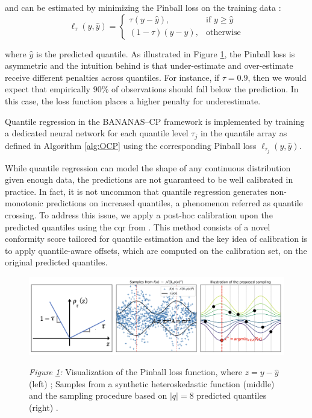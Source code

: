 {\begin{description}[leftmargin=0cm, listparindent=\parindent]
	\noindent and can be estimated by minimizing the Pinball loss on the training data \cite{koenker1978regression}:
		\begin{equation}
			\ell_\tau(y, \hat{y}) = 
			\begin{cases}
			\tau (y - \hat{y}), & \text{if } y \geq \hat{y} \\
			(1 - \tau)(\hat{y} - y), & \text{otherwise}
			\end{cases}
		\label{pinballloss}
		\end{equation}
		
	\noindent where $\hat{y}$ is the predicted quantile.	 As illustrated in Figure \ref{fig:CQR}, the Pinball loss is asymmetric and the intuition behind is that under-estimate and over-estimate receive different penalties across quantiles. 	For instance, if $\tau=0.9$, then we would expect that empirically 90\% of observations should fall below the prediction. In this case, the loss function places a higher penalty for underestimate.	
	
	Quantile regression in the BANANAS--CP framework is implemented by training a dedicated neural network for each quantile level $\tau_j$ in the quantile array as defined in Algorithm \ref{alg:OCP} using the corresponding Pinball loss $\ell_{\tau_j}(y, \hat{y})$. 
	
	 While quantile regression can model the shape of any continuous distribution given enough data, the predictions are not guaranteed to be well calibrated in practice. In fact, it is not uncommon that quantile regression generates non-monotonic predictions on increased quantiles, a phenomenon referred as quantile crossing. To address this issue, we apply a post-hoc calibration upon the predicted quantiles using the \gls{cqr} from \cite{romano2019conformalized}. This method consists of a novel conformity score tailored for quantile estimation and the key idea of calibration is to apply quantile-aware offsets, which are computed on the calibration set, on the original predicted quantiles.
	 
	 \begin{figure}[t]	
	 	\centering
		\includegraphics[scale=0.48]{figs/pinball_loss_and_CQR.png}
		\label{fig:CQR}
		\parbox{\linewidth}{
	 	\vspace{0.5em}
 	 	{\small \textit{Figure \ref{fig:CQR}:} Visualization of the Pinball loss function, where $z=y - \hat{y}$ (left) \cite{romano2019conformalized}; Samples from a synthetic heteroskedastic function (middle) and  the sampling procedure based on $|q| = 8$ predicted quantiles (right) \cite{salinas2023optimizing}.
 	 	}
 		}
	\end{figure}
	 

\end{description}}

